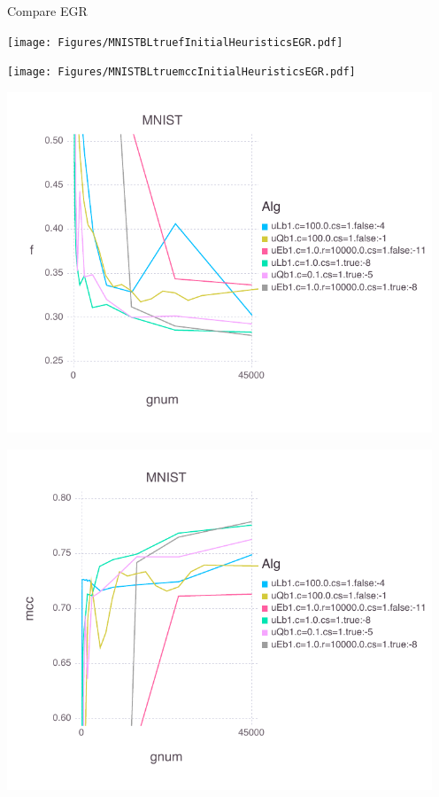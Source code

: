 \documentclass[11pt]{article}
\begin{document}
	
	Compare EGR

	\texttt{[image: Figures/MNISTBLtruefInitialHeuristicsEGR.pdf]}
	
	\texttt{[image: Figures/MNISTBLtruemccInitialHeuristicsEGR.pdf]}
	
	\includegraphics[width= 5in]{Figures/MNISTBLtruefInitialHeuristics.pdf}
	
	\includegraphics[width= 5in]{Figures/MNISTBLtruemccInitialHeuristics.pdf}
	
\end{document}
